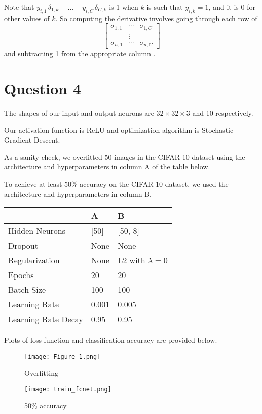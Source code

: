 \documentclass[12pt, a4paper]{article}
\begin{document}
Note that $y_{i,1} \, \delta_{1,k} + \dots + y_{i,C} \, \delta_{C,k}$ is 1 when $k$ is such that $y_{i,k} = 1$, and it is 0 for other values of $k$. So computing the derivative involves going through each row of
\[ \begin{bmatrix}
   \sigma_{1,1} & \dotsm & \sigma_{1,C} \\
   & \vdots & \\
   \sigma_{n,1} & \dotsm & \sigma_{n,C}
   \end{bmatrix} \]
and subtracting 1 from the appropriate column \cite{cross}.

\section*{Question 4}

The shapes of our input and output neurons are $32 \times 32 \times 3$ and 10 respectively.\par
\bigskip
Our activation function is ReLU and optimization algorithm is Stochastic Gradient Descent.\par
\bigskip
As a sanity check, we overfitted 50 images in the CIFAR-10 dataset using the architecture and hyperparameters in column A of the table below.\par
\bigskip
To achieve at least 50\% accuracy on the CIFAR-10 dataset, we used the architecture and hyperparameters in column B.
\begin{center}
\begin{tabular} { C{4cm} | C{2.5cm} C{3cm} }
    & A & B \\ \hline
    Hidden Neurons      & [50]  & [50, 8] \\
    Dropout				& None	& None  \\
    Regularization      & None  & L2 with $\lambda = 0$ \\
    Epochs              &   20  &   20  \\
    Batch Size          &  100  &  100  \\
    Learning Rate       & 0.001 & 0.005 \\
    Learning Rate Decay & 0.95  & 0.95
\end{tabular}
\end{center}
\bigskip

Plots of loss function and classification accuracy are provided below.

\begin{figure} [h!]
    \begin{minipage}{0.5\textwidth}
    \centering
    \texttt{[image: Figure\_1.png]}
    \caption{Overfitting} \label{Fig:Data1}
    \end{minipage}
    \begin {minipage}{0.5\textwidth}
    \centering
    \texttt{[image: train\_fcnet.png]}
    \caption{50\% accuracy} \label{Fig:Data2}
    \end{minipage}
\end{figure}
\end{document}
